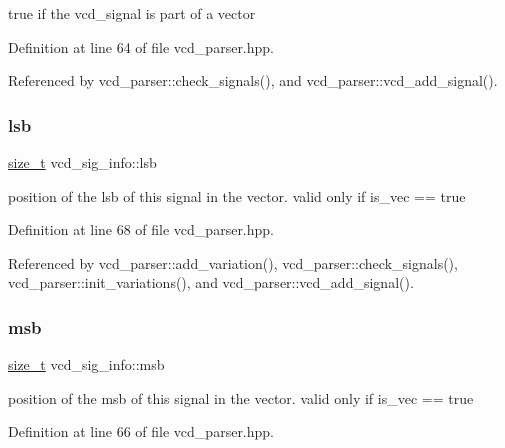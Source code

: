 true if the vcd\+\_\+signal is part of a vector 



Definition at line 64 of file vcd\+\_\+parser.\+hpp.



Referenced by vcd\+\_\+parser\+::check\+\_\+signals(), and vcd\+\_\+parser\+::vcd\+\_\+add\+\_\+signal().

\mbox{\label{classvcd__sig__info_a953e888527567548c93f1d4ee28110ed}} 
\subsubsection{\texorpdfstring{lsb}{lsb}}
{\footnotesize\ttfamily \hyperlink{tutorial__fpt__2017_2intro_2sixth_2test_8c_a7c94ea6f8948649f8d181ae55911eeaf}{size\+\_\+t} vcd\+\_\+sig\+\_\+info\+::lsb}



position of the lsb of this signal in the vector. valid only if is\+\_\+vec == true 



Definition at line 68 of file vcd\+\_\+parser.\+hpp.



Referenced by vcd\+\_\+parser\+::add\+\_\+variation(), vcd\+\_\+parser\+::check\+\_\+signals(), vcd\+\_\+parser\+::init\+\_\+variations(), and vcd\+\_\+parser\+::vcd\+\_\+add\+\_\+signal().

\mbox{\label{classvcd__sig__info_a70cf9ed072ef283fbb3eb7f20f5979ac}} 
\subsubsection{\texorpdfstring{msb}{msb}}
{\footnotesize\ttfamily \hyperlink{tutorial__fpt__2017_2intro_2sixth_2test_8c_a7c94ea6f8948649f8d181ae55911eeaf}{size\+\_\+t} vcd\+\_\+sig\+\_\+info\+::msb}



position of the msb of this signal in the vector. valid only if is\+\_\+vec == true 



Definition at line 66 of file vcd\+\_\+parser.\+hpp.



